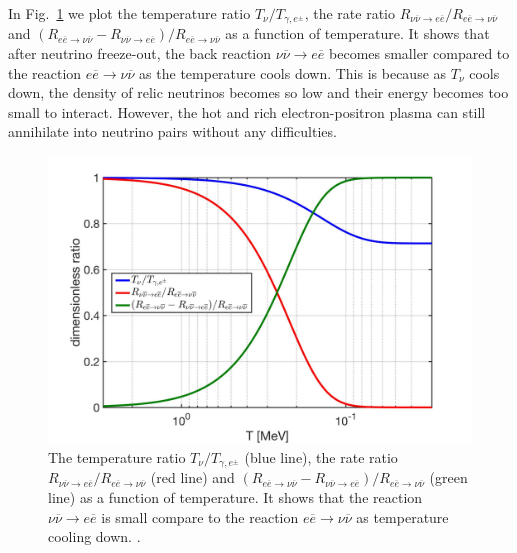 In Fig.~\ref{DimensionlessRatio} we plot the temperature ratio $T_\nu/T_{\gamma,e^\pm}$, the rate ratio $R_{\nu\overline{\nu}\rightarrow e\overline{e}}/ R_{e\overline{e}\rightarrow\nu\overline{\nu}}$ and $(R_{e\overline{e}\rightarrow\nu\overline{\nu}}-R_{\nu\overline{\nu}\rightarrow e\overline{e}})/ R_{e\overline{e}\rightarrow\nu\overline{\nu}}$ as a function of temperature. It shows that after neutrino freeze-out, the back reaction $\nu\overline{\nu}\rightarrow e\overline{e}$ becomes smaller compared to the reaction $e\overline{e}\rightarrow\nu\overline{\nu}$ as the temperature cools down. This is because as $T_\nu$ cools down, the density of relic neutrinos becomes so low and their energy becomes too small to interact. However, the hot and rich electron-positron plasma can still annihilate into neutrino pairs without any difficulties.
\begin{figure}[ht]
\begin{center}
\includegraphics[width=0.9\linewidth]{./plots/DimensionlessRatio_ExtraNeutrino}
\caption{The temperature ratio $T_\nu/T_{\gamma,e^\pm}$ (blue line), the rate ratio $R_{\nu\overline{\nu}\rightarrow e\overline{e}}/ R_{e\overline{e}\rightarrow\nu\overline{\nu}}$ (red line) and $(R_{e\overline{e}\rightarrow\nu\overline{\nu}}-R_{\nu\overline{\nu}\rightarrow e\overline{e}})/ R_{e\overline{e}\rightarrow\nu\overline{\nu}}$ (green line) as a function of temperature. It shows that the reaction $\nu\overline{\nu}\rightarrow e\overline{e}$ is small compare to the reaction $e\overline{e}\rightarrow\nu\overline{\nu}$ as temperature cooling down. .}
\label{DimensionlessRatio}
\end{center}
\end{figure}

